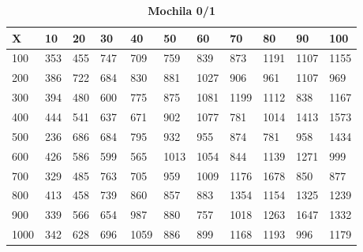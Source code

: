 \documentclass[10pt,letterpaper]{article}
\begin{document}
\newpage 
{}
\begin{center}
\begin{table}\renewcommand{\arraystretch}{2.5}
\caption{\large \textbf{Mochila 0/1}}
\centering
\begin{tabular} { |m{0.5cm}|m{1.3cm}|m{1.3cm}|m{1.3cm}|m{1.3cm}|m{1.3cm}|m{1.3cm}|m{1.3cm}|m{1.3cm}|m{1.3cm}|m{1.3cm}|} 
\hline
\rowcolor{Gray}
\centering \textbf{X} & \centering \textbf{10} & \centering \textbf{20} & \centering \textbf{30}\ & \centering \textbf{40} & \centering \textbf{50} & \centering \textbf{60}\ & \centering \textbf{70} & \centering \textbf{80} & \centering \textbf{90}\ & \textbf{100} \\\hline
\cellcolor{Gray}100 & \Large 353 & \Large 455 & \Large 747 & \Large 709 & \Large 759 & \Large 839 & \Large 873 & \Large 1191 & \Large 1107 & \Large 1155 \\
\hline
\cellcolor{Gray}200 & \Large 386 & \Large 722 & \Large 684 & \Large 830 & \Large 881 & \Large 1027 & \Large 906 & \Large 961 & \Large 1107 & \Large 969 \\
\hline
\cellcolor{Gray}300 & \Large 394 & \Large 480 & \Large 600 & \Large 775 & \Large 875 & \Large 1081 & \Large 1199 & \Large 1112 & \Large 838 & \Large 1167 \\
\hline
\cellcolor{Gray}400 & \Large 444 & \Large 541 & \Large 637 & \Large 671 & \Large 902 & \Large 1077 & \Large 781 & \Large 1014 & \Large 1413 & \Large 1573 \\
\hline
\cellcolor{Gray}500 & \Large 236 & \Large 686 & \Large 684 & \Large 795 & \Large 932 & \Large 955 & \Large 874 & \Large 781 & \Large 958 & \Large 1434 \\
\hline
\cellcolor{Gray}600 & \Large 426 & \Large 586 & \Large 599 & \Large 565 & \Large 1013 & \Large 1054 & \Large 844 & \Large 1139 & \Large 1271 & \Large 999 \\
\hline
\cellcolor{Gray}700 & \Large 329 & \Large 485 & \Large 763 & \Large 705 & \Large 959 & \Large 1009 & \Large 1176 & \Large 1678 & \Large 850 & \Large 877 \\
\hline
\cellcolor{Gray}800 & \Large 413 & \Large 458 & \Large 739 & \Large 860 & \Large 857 & \Large 883 & \Large 1354 & \Large 1154 & \Large 1325 & \Large 1239 \\
\hline
\cellcolor{Gray}900 & \Large 339 & \Large 566 & \Large 654 & \Large 987 & \Large 880 & \Large 757 & \Large 1018 & \Large 1263 & \Large 1647 & \Large 1332 \\
\hline
\cellcolor{Gray}1000 & \Large 342 & \Large 628 & \Large 696 & \Large 1059 & \Large 886 & \Large 899 & \Large 1168 & \Large 1193 & \Large 996 & \Large 1179 \\
\hline
\end{tabular} \\
\end{table}
\end{center}
\end{document}
